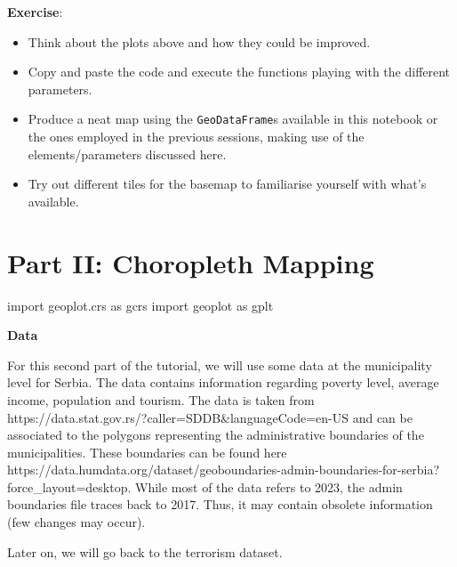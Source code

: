 \documentclass[
  letterpaper,
  DIV=11,
  numbers=noendperiod]{scrreprt}
\newenvironment{Shaded}{\begin{snugshade}}{\end{snugshade}}
\newcommand{\ImportTok}[1]{\textcolor[rgb]{0.00,0.46,0.62}{#1}}
\newcommand{\NormalTok}[1]{\textcolor[rgb]{0.00,0.23,0.31}{#1}}
\providecommand{\tightlist}{%
  \setlength{\itemsep}{0pt}\setlength{\parskip}{0pt}}\usepackage{longtable,booktabs,array}
\begin{document}
\textbf{Exercise}:

\begin{itemize}
\tightlist
\item
  Think about the plots above and how they could be improved.
\item
  Copy and paste the code and execute the functions playing with the
  different parameters.
\item
  Produce a neat map using the \texttt{GeoDataFrame}s available in this
  notebook or the ones employed in the previous sessions, making use of
  the elements/parameters discussed here.
\item
  Try out different tiles for the basemap to familiarise yourself with
  what's available.
\end{itemize}

\section{Part II: Choropleth Mapping}\label{part-ii-choropleth-mapping}

\begin{Shaded}
\begin{Highlighting}[]
\ImportTok{import}\NormalTok{ geoplot.crs }\ImportTok{as}\NormalTok{ gcrs}
\ImportTok{import}\NormalTok{ geoplot }\ImportTok{as}\NormalTok{ gplt}
\end{Highlighting}
\end{Shaded}

\textbf{Data}

For this second part of the tutorial, we will use some data at the
municipality level for Serbia. The data contains information regarding
poverty level, average income, population and tourism. The data is taken
from https://data.stat.gov.rs/?caller=SDDB\&languageCode=en-US and can
be associated to the polygons representing the administrative boundaries
of the municipalities. These boundaries can be found here
https://data.humdata.org/dataset/geoboundaries-admin-boundaries-for-serbia?force\_layout=desktop.
While most of the data refers to 2023, the admin boundaries file traces
back to 2017. Thus, it may contain obsolete information (few changes may
occur).

Later on, we will go back to the terrorism dataset.
\end{document}
